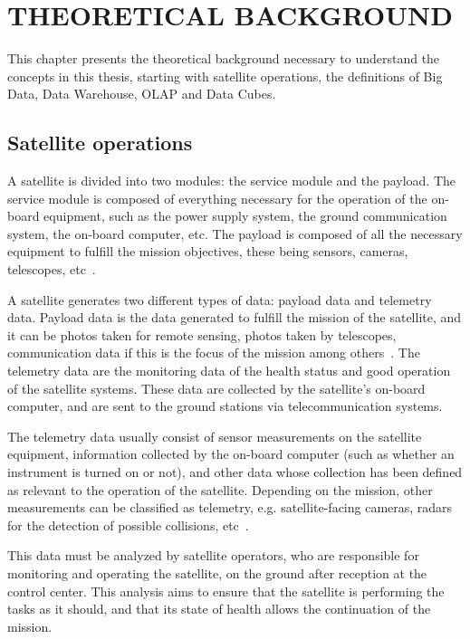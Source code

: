 
\chapter{THEORETICAL BACKGROUND}\label{ch:fun}

This chapter presents the theoretical background necessary to understand the concepts in this thesis, starting with satellite operations, the definitions of Big Data, Data Warehouse, OLAP and Data Cubes.

\section{Satellite operations}\label{ch:fun:operations}

A satellite is divided into two modules: the service module and the payload.
The service module is composed of everything necessary for the operation of the on-board equipment, such as the power supply system, the ground communication system, the on-board computer, etc.
The payload is composed of all the necessary equipment to fulfill the mission objectives, these being sensors, cameras, telescopes, etc~\cite{larsonSpaceMissionAnalysis1999}.

A satellite generates two different types of data: payload data and telemetry data.
Payload data is the data generated to fulfill the mission of the satellite, and it can be photos taken for remote sensing, photos taken by telescopes, communication data if this is the focus of the mission among others~\cite{larsonSpaceMissionAnalysis1999}.
The telemetry data are the monitoring data of the health status and good operation of the satellite systems. These data are collected by the satellite's on-board computer, and are sent to the ground stations via telecommunication systems.

The telemetry data usually consist of sensor measurements on the satellite equipment, information collected by the on-board computer (such as whether an instrument is turned on or not), and other data whose collection has been defined as relevant to the operation of the satellite.
Depending on the mission, other measurements can be classified as telemetry, e.g. satellite-facing cameras, radars for the detection of possible collisions, etc~\cite{kragCmSpaceDebris2017}.

This data must be analyzed by satellite operators, who are responsible for monitoring and operating the satellite, on the ground after reception at the control center.
This analysis aims to ensure that the satellite is performing the tasks as it should, and that its state of health allows the continuation of the mission.

